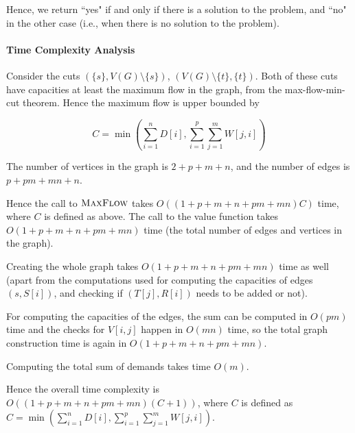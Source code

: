 \documentclass[answers]{exam}
\begin{document}
\begin{questions}
\begin{solution}
Hence, we return ``yes" if and only if there is a solution to the problem, and ``no" in the other case (i.e., when there is no solution to the problem).

\paragraph{Time Complexity Analysis}
Consider the cuts $(\{s\}, V(G) \setminus \{s\})$, $(V(G) \setminus \{t\}, \{t\})$. Both of these cuts have capacities at least the maximum flow in the graph, from the max-flow-min-cut theorem.
Hence the maximum flow is upper bounded by 

$$C = \min \left(\sum_{i = 1}^n D[i], \sum_{i = 1}^p \sum_{j = 1}^m W[j, i]\right)$$

The number of vertices in the graph is $2 + p + m + n$, and the number of edges is $p + pm + mn + n$. 

Hence the call to $\textsc{MaxFlow}$ takes $O((1 + p + m + n + pm + mn)C)$ time, where $C$ is defined as above. The call to the value function takes $O(1 + p + m + n + pm + mn)$ time (the total number of edges and vertices in the graph).

Creating the whole graph takes $O(1 + p + m + n + pm + mn)$ time as well (apart from the computations used for computing the capacities of edges $(s, S[i])$, and checking if $(T[j], R[i])$ needs to be added or not).

For computing the capacities of the edges, the sum can be computed in $O(pm)$ time and the checks for $V[i, j]$ happen in $O(mn)$ time, so the total graph construction time is again in $O(1 + p + m + n + pm + mn)$.

Computing the total sum of demands takes time $O(m)$.

Hence the overall time complexity is $O((1 + p + m + n + pm + mn)(C + 1))$, where $C$ is defined as $C = \min \left(\sum_{i = 1}^n D[i], \sum_{i = 1}^p \sum_{j = 1}^m W[j, i]\right)$.


\end{solution}

\end{questions}
\end{document}
